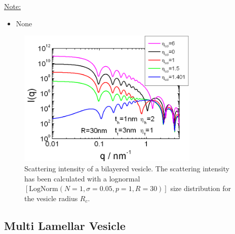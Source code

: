 \noindent\underline{Note:}
\begin{itemize}
\item[~] None
\end{itemize}

\begin{figure}[htb]
\begin{center}
\includegraphics[width=0.768\textwidth,height=0.588\textwidth]{../images/form_factor/spheres/bilayered_vesicle.png}
\end{center}
\caption{Scattering intensity of a bilayered vesicle. The scattering intensity has been calculated
with a lognormal $[\mathrm{LogNorm}(N\!=\!1,\sigma\!=\!0.05,p\!=\!1,R\!=\!30)]$ size distribution for the vesicle radius $R_c$.}
\label{fig:I_BiLayeredVesicle}
\end{figure}


\clearpage
\subsection{Multi Lamellar Vesicle}
\label{sect:MultiLamellarVesicle} ~\\

